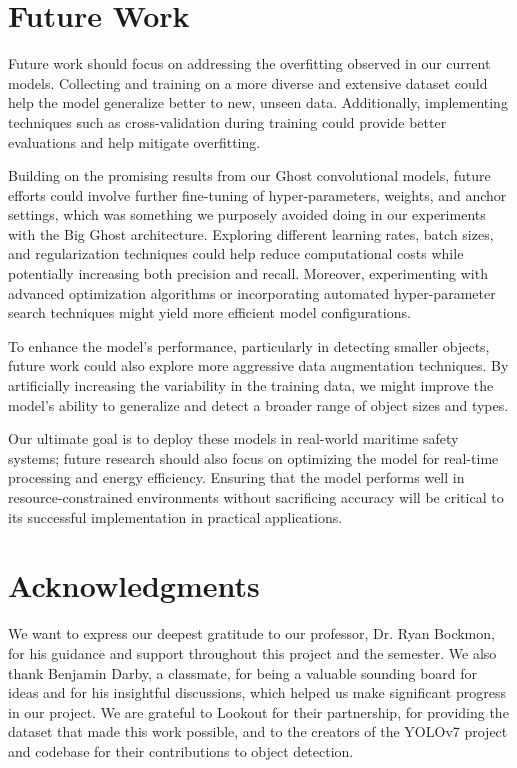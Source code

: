 \documentclass[sigplan,nonacm]{acmart}
\begin{document}
\section*{Future Work}
Future work should focus on addressing the overfitting observed in our current models. Collecting and training on a more diverse and extensive dataset could help the model generalize better to new, unseen data. Additionally, implementing techniques such as cross-validation during training could provide better evaluations and help mitigate overfitting.

Building on the promising results from our Ghost convolutional models, future efforts could involve further fine-tuning of hyper-parameters, weights, and anchor settings, which was something we purposely avoided doing in our experiments with the Big Ghost architecture. Exploring different learning rates, batch sizes, and regularization techniques could help reduce computational costs while potentially increasing both precision and recall. Moreover, experimenting with advanced optimization algorithms or incorporating automated hyper-parameter search techniques might yield more efficient model configurations.

To enhance the model's performance, particularly in detecting smaller objects, future work could also explore more aggressive data augmentation techniques. By artificially increasing the variability in the training data, we might improve the model's ability to generalize and detect a broader range of object sizes and types.

Our ultimate goal is to deploy these models in real-world maritime safety systems; future research should also focus on optimizing the model for real-time processing and energy efficiency. Ensuring that the model performs well in resource-constrained environments without sacrificing accuracy will be critical to its successful implementation in practical applications.

\section*{Acknowledgments}
We want to express our deepest gratitude to our professor, Dr. Ryan Bockmon, for his guidance and support throughout this project and the semester. We also thank Benjamin Darby, a classmate, for being a valuable sounding board for ideas and for his insightful discussions, which helped us make significant progress in our project. We are grateful to Lookout for their partnership, for providing the dataset that made this work possible, and to the creators of the YOLOv7 project and codebase for their contributions to object detection.
\end{document}
